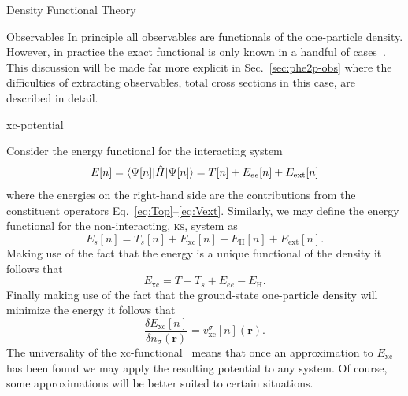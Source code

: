 \documentclass[a5paper, 9 pt]{extreport}
\begin{document}
\begin{chapter}{Density Functional Theory \label{chap:dft}}
\begin{section}{Observables \label{sec:obs}}
      In principle all observables are functionals of the one-particle density. However, in practice the
      exact functional is only known in a handful of cases~\cite[p.~211-213]{obs_exac}. This discussion
      will be made far more explicit in Sec.~\ref{sec:phe2p-obs} where the difficulties of extracting
      observables, total cross sections in this case, are described in detail.

   \end{section}

   \begin{section}{xc-potential \label{sec:xcpot}}

      Consider the energy functional for the interacting system
      \begin{equation} \label{eq:efunc}
         E[n] = \braket{\Psi[n] | \hat{H} | \Psi[n] }= T[n] + E_{ee}[n] + E_\mathrm{ext}[n]
      \end{equation}
      where the energies on the right-hand side are the contributions from the constituent operators
      Eq.~\eqref{eq:Top}--\eqref{eq:Vext}. Similarly, we may define the energy functional for the
      non-interacting, \textsc{ks}, system as
      \begin{equation} \label{eq:esfunc}
         E_s[n] =  T_s[n] + E_\mathrm{xc}[n] + E_\mathrm{H}[n] + E_\mathrm{ext}[n].
      \end{equation}
      Making use of the fact that the energy is a unique functional of the density it follows that
      \begin{equation} \label{eq:exc}
         E_\mathrm{xc} = T - T_s + E_{ee} - E_\mathrm{H}.
      \end{equation}
      Finally making use of the fact that the ground-state one-particle density will minimize the energy
      it follows that
      \begin{equation} \label{eq:vxc-der}
         \frac{\delta E_\mathrm{xc}[n]}{\delta n_\sigma(\mathbf{r})}
            = v^\sigma_\mathrm{xc}[n](\mathbf{r}).
      \end{equation}
      The universality of the xc-functional~\cite{dft-engel} means that once an approximation to
      $E_\mathrm{xc}$ has been found we may apply the resulting potential to any system. Of course,
      some approximations will be better suited to certain situations.


\end{section}
\end{chapter}
\end{document}
